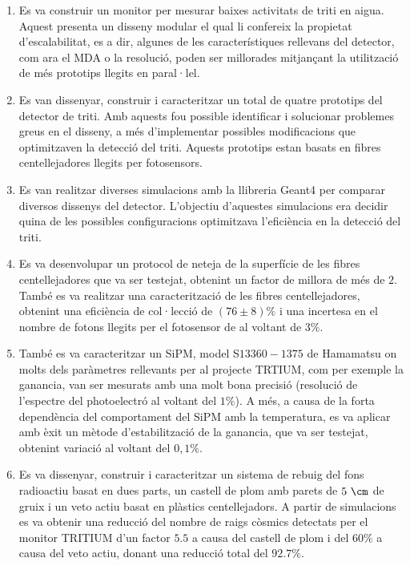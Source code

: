 \begin{enumerate}

\item{} Es va construir un monitor per mesurar baixes activitats de triti en aigua. Aquest presenta un disseny modular el qual li confereix la propietat d'escalabilitat, es a dir, algunes de les característiques rellevans del detector, com ara el MDA o la resolució, poden ser millorades mitjançant la utilització de més prototips llegits en paral·lel.

\item{} Es van dissenyar, construir i caracteritzar un total de quatre prototips del detector de triti. Amb aquests fou possible identificar i solucionar problemes greus en el disseny, a més d'implementar possibles modificacions que optimitzaven la detecció del triti. Aquests prototips estan basats en fibres centellejadores llegits per fotosensors.

\item{} Es van realitzar diverses simulacions amb la llibreria Geant4 per comparar diversos dissenys del detector. L'objectiu d'aquestes simulacions era decidir quina de les possibles configuracions optimitzava l'eficiència en la detecció del triti.

\item{} Es va desenvolupar un protocol de neteja de la superfície de les fibres centellejadores que va ser testejat, obtenint un factor de millora de més de $2$. També es va realitzar una caracterització de les fibres centellejadores, obtenint una eficiència de col·lecció de $(76 \pm 8)\%$ i una incertesa en el nombre de fotons llegits per el fotosensor de al voltant de $3\%$.

\item{} També es va caracteritzar un SiPM, model S$13360-1375$ de Hamamatsu on molts dels paràmetres rellevants per al projecte TRTIUM, com per exemple la ganancia, van ser mesurats amb una molt bona precisió (resolució de l'espectre del photoelectró al voltant del $1\%$). A més, a causa de la forta dependència del comportament del SiPM amb la temperatura, es va aplicar amb èxit un mètode d'estabilització de la ganancia, que va ser testejat, obtenint variació al voltant del $0,1\%$.

\item{} Es va dissenyar, construir i caracteritzar un sistema de rebuig del fons radioactiu basat en dues parts, un castell de plom amb parets de $5~\cm$ de gruix i un veto actiu basat en plàstics centellejadors. A partir de simulacions es va obtenir una reducció del nombre de raigs còsmics detectats per el monitor TRITIUM d'un factor $5.5$ a causa del castell de plom i del $60\%$ a causa del veto actiu, donant una reducció total del $92.7\%$.


\end{enumerate}
